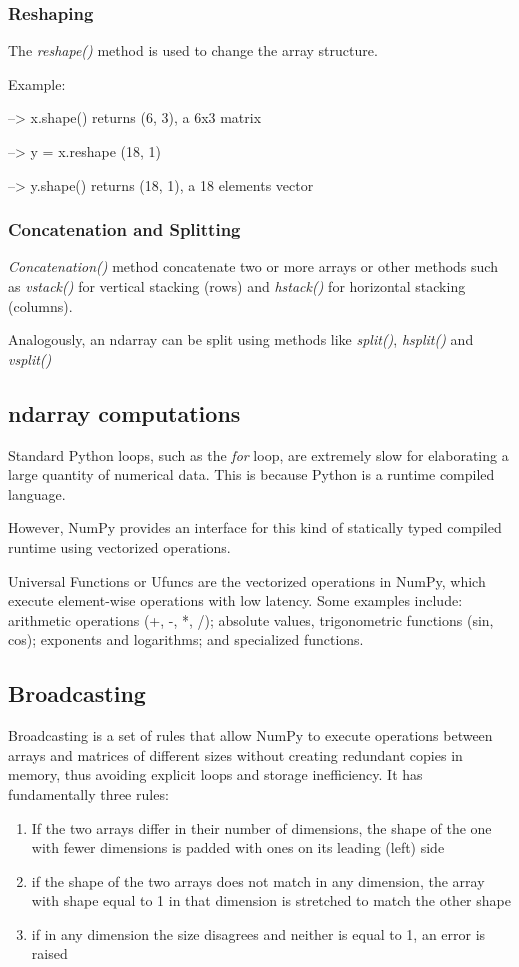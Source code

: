 \subsubsection{Reshaping}
The \textit{reshape()} method is used to change the array structure. \par
Example: \par
--> x.shape() returns (6, 3), a 6x3 matrix \par
--> y = x.reshape (18, 1) \par
--> y.shape() returns (18, 1),  a 18 elements vector

\subsubsection{Concatenation and Splitting}
\textit{Concatenation()} method concatenate two or more arrays or other methods such as \textit{vstack()} for vertical stacking (rows) and \textit{hstack()} for horizontal stacking (columns).\par
Analogously, an ndarray can be split using methods like \textit{split()}, \textit{hsplit()} and \textit{vsplit()}

\subsection{ndarray computations}
Standard Python loops, such as the \textit{for} loop, are extremely slow for elaborating a large quantity of numerical data. This is because Python is a runtime compiled language. \par
However, NumPy provides an interface for this kind of statically typed compiled runtime using vectorized operations.\par
Universal Functions or Ufuncs are the vectorized operations in NumPy, which execute element-wise operations with low latency. Some examples include: arithmetic operations (+, -, *, /); absolute values, trigonometric functions (sin, cos); exponents and logarithms; and specialized functions.

\subsection{Broadcasting}
Broadcasting is a set of rules that allow NumPy to execute operations between arrays and matrices of different sizes without creating redundant copies in memory, thus avoiding explicit loops and storage inefficiency. It has fundamentally three rules:
\begin{enumerate}[noitemsep]
    \item If the two arrays differ in their number of dimensions, the shape of the one with fewer dimensions is padded with ones on its leading (left) side
    \item  if the shape of the two arrays does not match in any dimension, the array with shape equal to 1 in that dimension is stretched to match the other shape
    \item if in any dimension the size disagrees and neither is equal to 1, an error is raised 
\end{enumerate}

